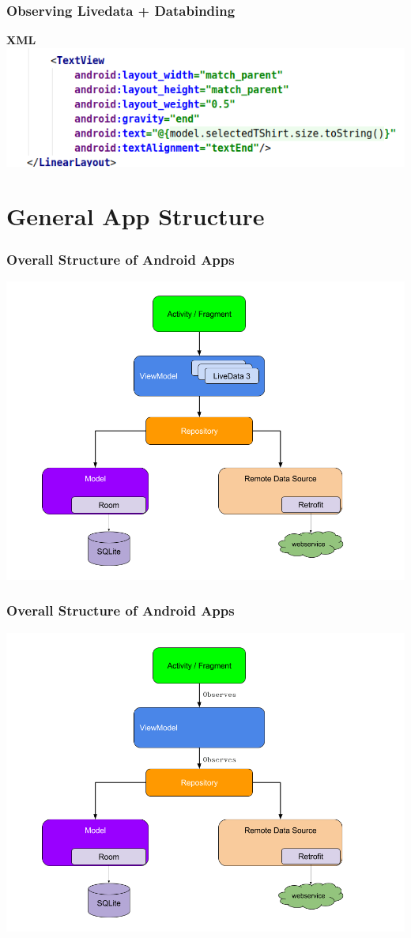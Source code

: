 \documentclass{beamer}
\begin{document}
	\begin{frame}	
	\frametitle{Observing Livedata + Databinding}
	\textbf{XML}
	\includegraphics[width=1\textwidth]{DataBindingInTextView.png}
	\end{frame}
	
	\section[App Structure]{General App Structure}
	\begin{frame}
		\frametitle{Overall Structure of Android Apps}
		\includegraphics[width=1\textwidth]{architecture.png}
	\end{frame}
	
	\begin{frame}
		\frametitle{Overall Structure of Android Apps}
		\includegraphics[width=1\textwidth]{architecture_observes.png}
	\end{frame}
	
\end{document}
